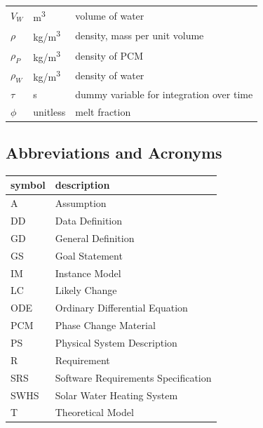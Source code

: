 \documentclass[12pt]{article}
\newcommand{\blt}{- } %
\newcommand{\progname}{SWHS}
\begin{document}
\begin{longtable*}{l l p{12cm}}
  $V_W$ & \si[per-mode=symbol] {\cubic\meter} & volume of water
  \\
  $\rho$ & \si[per-mode=symbol] {\kilogram\per\cubic\metre} & density, mass per
  unit volume
  \\
  $\rho_P$ & \si[per-mode=symbol] {\kilogram\per\cubic\metre} & density of PCM
  \\
  $\rho_W$ & \si[per-mode=symbol] {\kilogram\per\cubic\metre} & density of water
  \\
  $\tau$ & \si[per-mode=symbol] {\second} & dummy variable for integration over time
  \\
  $\phi$ & \si[per-mode=symbol] {unitless} & melt fraction
  \\
  \bottomrule
\end{longtable*}



\subsection{Abbreviations and Acronyms}

\renewcommand{\arraystretch}{1.2}
\begin{tabular}{l l} 
  \toprule		
  \textbf{symbol} & \textbf{description}\\
  \midrule 
  A & Assumption\\
  DD & Data Definition\\
  GD & General Definition\\
  GS & Goal Statement\\
  IM & Instance Model\\
  LC & Likely Change\\
  ODE & Ordinary Differential Equation\\
  PCM & Phase Change Material\\
  PS & Physical System Description\\
  R & Requirement\\
  SRS & Software Requirements Specification\\
  \progname{} & Solar Water Heating System\\
  T & Theoretical Model\\
  \bottomrule
\end{tabular}\\
\end{document}
